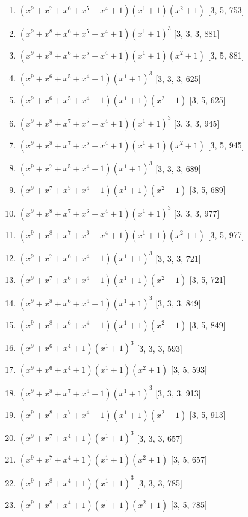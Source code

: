 \documentclass[10pt,twocolumn]{article}
\begin{document}
\begin{enumerate}
\item $(x^{9} + x^{7} + x^{6} + x^{5} + x^{4} + 1)(x^{1} + 1)(x^{2} + 1)$  [3, 5, 753]
\item $(x^{9} + x^{8} + x^{6} + x^{5} + x^{4} + 1)(x^{1} + 1)^{3}$  [3, 3, 3, 881]
\item $(x^{9} + x^{8} + x^{6} + x^{5} + x^{4} + 1)(x^{1} + 1)(x^{2} + 1)$  [3, 5, 881]
\item $(x^{9} + x^{6} + x^{5} + x^{4} + 1)(x^{1} + 1)^{3}$  [3, 3, 3, 625]
\item $(x^{9} + x^{6} + x^{5} + x^{4} + 1)(x^{1} + 1)(x^{2} + 1)$  [3, 5, 625]
\item $(x^{9} + x^{8} + x^{7} + x^{5} + x^{4} + 1)(x^{1} + 1)^{3}$  [3, 3, 3, 945]
\item $(x^{9} + x^{8} + x^{7} + x^{5} + x^{4} + 1)(x^{1} + 1)(x^{2} + 1)$  [3, 5, 945]
\item $(x^{9} + x^{7} + x^{5} + x^{4} + 1)(x^{1} + 1)^{3}$  [3, 3, 3, 689]
\item $(x^{9} + x^{7} + x^{5} + x^{4} + 1)(x^{1} + 1)(x^{2} + 1)$  [3, 5, 689]
\item $(x^{9} + x^{8} + x^{7} + x^{6} + x^{4} + 1)(x^{1} + 1)^{3}$  [3, 3, 3, 977]
\item $(x^{9} + x^{8} + x^{7} + x^{6} + x^{4} + 1)(x^{1} + 1)(x^{2} + 1)$  [3, 5, 977]
\item $(x^{9} + x^{7} + x^{6} + x^{4} + 1)(x^{1} + 1)^{3}$  [3, 3, 3, 721]
\item $(x^{9} + x^{7} + x^{6} + x^{4} + 1)(x^{1} + 1)(x^{2} + 1)$  [3, 5, 721]
\item $(x^{9} + x^{8} + x^{6} + x^{4} + 1)(x^{1} + 1)^{3}$  [3, 3, 3, 849]
\item $(x^{9} + x^{8} + x^{6} + x^{4} + 1)(x^{1} + 1)(x^{2} + 1)$  [3, 5, 849]
\item $(x^{9} + x^{6} + x^{4} + 1)(x^{1} + 1)^{3}$  [3, 3, 3, 593]
\item $(x^{9} + x^{6} + x^{4} + 1)(x^{1} + 1)(x^{2} + 1)$  [3, 5, 593]
\item $(x^{9} + x^{8} + x^{7} + x^{4} + 1)(x^{1} + 1)^{3}$  [3, 3, 3, 913]
\item $(x^{9} + x^{8} + x^{7} + x^{4} + 1)(x^{1} + 1)(x^{2} + 1)$  [3, 5, 913]
\item $(x^{9} + x^{7} + x^{4} + 1)(x^{1} + 1)^{3}$  [3, 3, 3, 657]
\item $(x^{9} + x^{7} + x^{4} + 1)(x^{1} + 1)(x^{2} + 1)$  [3, 5, 657]
\item $(x^{9} + x^{8} + x^{4} + 1)(x^{1} + 1)^{3}$  [3, 3, 3, 785]
\item $(x^{9} + x^{8} + x^{4} + 1)(x^{1} + 1)(x^{2} + 1)$  [3, 5, 785]

\end{enumerate}
\end{document}
